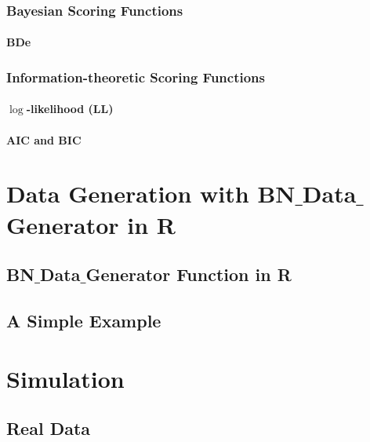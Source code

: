 \documentclass[12pt,a4paper,oneside]{book}
\theoremstyle{plain}
\theoremstyle{definition}
\theoremstyle{remark}
\theoremstyle{definition}
\numberwithin{equation}{chapter}
\begin{document}
\subsection{Bayesian Scoring Functions}


\subsubsection{BDe}


\subsection{Information-theoretic Scoring Functions}
%

\subsubsection{$\log$-likelihood (LL)}


\subsubsection{AIC and BIC}






\chapter{Data Generation with BN$\_$Data$\_$Generator in R}


\section{BN$\_$Data$\_$Generator Function in R}


\section{A Simple Example}






\chapter{Simulation}


\section{Real Data}
\end{document}
